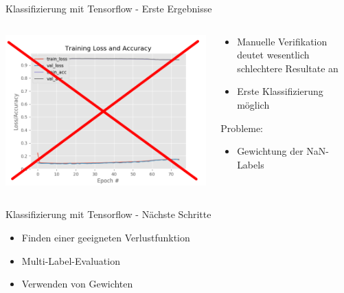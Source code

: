 \documentclass[10pt,%
	wide,%
	xcolor={x11names},%
	hyperref={colorlinks},%
	pantone312,%
	handout,%
	]{beamer}
\begin{document}
\begin{frame}[t]{Klassifizierung mit Tensorflow - Erste Ergebnisse}
	\begin{columns}
		\begin{column}[t]{6cm}
			\begin{center}
				\includegraphics[width=1\textwidth]{img/keras_training_loss_invalid.png}
			\end{center}
		\end{column}
		\begin{column}[t]{6cm}
			\begin{itemize}
				\item Manuelle Verifikation deutet wesentlich schlechtere Resultate an
				\item Erste Klassifizierung möglich
			\end{itemize}
			\vspace*{20px}
Probleme:
			\begin{itemize}
				\item Gewichtung der NaN-Labels 
			\end{itemize}
		\end{column}		
	\end{columns}
\end{frame}

\begin{frame}[t]{Klassifizierung mit Tensorflow - Nächste Schritte}
	\begin{itemize}
		\item Finden einer geeigneten Verlustfunktion
		\item Multi-Label-Evaluation
		\item Verwenden von Gewichten
	\end{itemize}
\end{frame}
\end{document}
